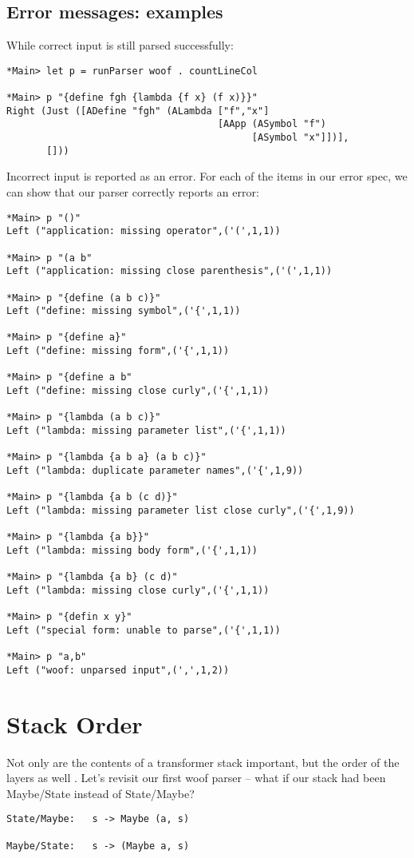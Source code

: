 \documentclass{tmr}
\begin{document}
\subsection{Error messages:  examples}
While correct input is still parsed successfully:
\begin{verbatim}
*Main> let p = runParser woof . countLineCol

*Main> p "{define fgh {lambda {f x} (f x)}}"
Right (Just ([ADefine "fgh" (ALambda ["f","x"] 
                                     [AApp (ASymbol "f") 
                                           [ASymbol "x"]])],
       []))
\end{verbatim}

Incorrect input is reported as an error.  For each of the items in our error spec, 
we can show that our parser correctly reports an error: 
\begin{verbatim}
*Main> p "()"
Left ("application: missing operator",('(',1,1))

*Main> p "(a b"
Left ("application: missing close parenthesis",('(',1,1))

*Main> p "{define (a b c)}"
Left ("define: missing symbol",('{',1,1))

*Main> p "{define a}"
Left ("define: missing form",('{',1,1))

*Main> p "{define a b"
Left ("define: missing close curly",('{',1,1))

*Main> p "{lambda (a b c)}"
Left ("lambda: missing parameter list",('{',1,1))

*Main> p "{lambda {a b a} (a b c)}"
Left ("lambda: duplicate parameter names",('{',1,9))

*Main> p "{lambda {a b (c d)}"
Left ("lambda: missing parameter list close curly",('{',1,9))

*Main> p "{lambda {a b}}"
Left ("lambda: missing body form",('{',1,1))

*Main> p "{lambda {a b} (c d)"
Left ("lambda: missing close curly",('{',1,1))

*Main> p "{defin x y}"
Left ("special form: unable to parse",('{',1,1))

*Main> p "a,b"
Left ("woof: unparsed input",(',',1,2))
\end{verbatim}




\section{Stack Order}
Not only are the contents of a transformer stack important, but the order of the
layers as well \cite{stack}.  Let's revisit our first woof parser -- what if our 
stack had been Maybe/State instead of State/Maybe?
\begin{verbatim}
State/Maybe:   s -> Maybe (a, s)

Maybe/State:   s -> (Maybe a, s)
\end{verbatim}
\end{document}
